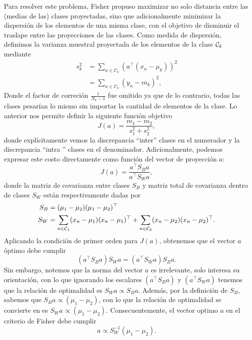 Para resolver este problema, Fisher propuso maximizar no solo distancia entre las (medias de las) clases proyectadas, sino que adicionalmente minimizar la dispersión de los elementos de una misma clase, con el objetivo de disminuir el traslape entre las proyecciones de las clases. Como medida de dispersión, definimos la varianza muestral proyectada de los elementos de la clase ${\mathcal C}_k$ mediante
\begin{align}
	s_k^2 &= \sum_{n\in \mathcal{C}_k}(a^\top(x_n-\mu_k))^2\\
	&= \sum_{n\in \mathcal{C}_k}(y_n-m_k)^2,
\end{align}
Donde el factor de correción $\frac{1}{N_k-1}$ fue omitido ya que de lo contrario, todas las clases pesarían lo mismo sin importar la cantidad de elementos de la clase. Lo anterior nos permite definir la siguiente función objetivo
\begin{equation}
J(a) = \frac{m_1-m_2}{s_1^2+s_2 ^2},
\end{equation}
donde explícitamente vemos la discrepancia ``inter'' clases en el numerador y la discrepancia  ``intra '' clases en el denominador. Adicionalmente, podemos expresar este costo directamente como función del vector de proyección $a$:
\begin{equation}
	J(a) = \frac{a^\top S_B a}{a^\top S_Wa},
\end{equation}
donde la matriz de covarianza entre clases $S_B$ y matriz total de covarianza dentro de clases $S_W$ están respectivamente dadas por
\begin{align}
	S_B &= (\mu_1-\mu_2)(\mu_1-\mu_2)^\top\\
	S_W &= \sum_{n\in {\mathcal C}_1}(x_n-\mu_1)(x_n-\mu_1)^\top +
	\sum_{n\in {\mathcal C}_2}(x_n-\mu_2)(x_n-\mu_2)^\top. 
\end{align}
Aplicando la condición de primer orden para $J(a)$, obtenemos que el vector $a$ óptimo debe cumplir
\begin{equation}
	(a^\top S_B a)S_W a = (a^\top S_W a)S_B a.	
\end{equation}
Sin embargo, notemos que la norma del vector  $a$ es irrelevante, solo interesa su orientación, con lo que  ignorando los escalares $(a^\top S_B a)$ y $(a^\top S_W a)$ tenemos que la relación de optimalidad es $S_W a \propto S_B a$. Además, por la definición de $S_B$, sabemos que $S_B a\propto(\mu_1-\mu_2)$, con lo que la relación de optimalidad se convierte en es $S_W a \propto (\mu_1-\mu_2)$. Consecuentemente, el vector optimo $a$ en el  criterio de Fisher debe cumplir
\begin{equation}
	a \propto S_W^{-1}(\mu_1-\mu_2).
\end{equation}

